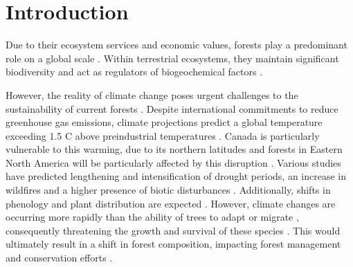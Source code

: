 \section*{Introduction}
\label{sec:intro1}


Due to their ecosystem services and economic values, forests play a predominant role on a global scale \citep{Balvanera2006Quantifyingevidence}. 
Within terrestrial ecosystems, they maintain significant biodiversity and act as regulators of biogeochemical factors \citep{Pawson2013Plantationforests}. 

However, the reality of climate change poses urgent challenges to the sustainability of current forests \citep{McKenney2009Climatechange,Trumbore2015Foresthealth,Seidl2017Forestdisturbances,Messier2022Warningnatural}. 
Despite international commitments to reduce greenhouse gas emissions, climate projections predict a global temperature exceeding 1.5 C above preindustrial temperatures \citep{Matthews2022Currentglobal}. 
Canada is particularly vulnerable to this warming, due to its northern latitudes \citep{Alo2008Potentialfuture,Bush2019Canadachanging} and forests in Eastern North America will be particularly affected by this disruption \citep{Park2014Canboreal,Mahony2017closerlook,Sittaro2017Treerange,Messier2022Warningnatural}. 
Various studies have predicted lengthening and intensification of drought periods, an increase in wildfires and a higher presence of biotic disturbances \citep{Parmesan2007Influencesspecies,Joyce2013Climatechange,Gatti2021Amazoniacarbon,Heidari2021Effectsclimate}. 
Additionally, shifts in phenology and plant distribution are expected \citep{Aitken2008Adaptationmigration,Chuine2010Whydoes,Zhu2012Failuremigrate,Gray2013Trackingsuitable}. 
However, climate changes are occurring more rapidly than the ability of trees to adapt or migrate \citep{Aitken2008Adaptationmigration,Loarie2009velocityclimate,Vitt2010Assistedmigration,Harrison2020Plantcommunity}, 
consequently threatening the growth and survival of these species \citep{Zhu2012Failuremigrate,Sittaro2017Treerange,Woodall2018Decadalchanges}.
This would ultimately result in a shift in forest composition, impacting forest management and conservation efforts \citep{McKenney2009Climatechange,Chmura2011Forestresponses,Lo2011Linkingclimate}.

